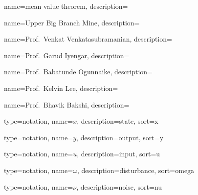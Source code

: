 	{
		name={mean value theorem},
		description={}
	}	
	
	
	{
		name={Upper Big Branch Mine},
		description={}
	}

	{
		name={Prof.~Venkat Venkatasubramanian},
		description={}
	}

	{
		name={Prof.~Garud Iyengar},
		description={}
	}
	
	{
		name={Prof.~Babatunde Ogunnaike},
		description={}
	}

	{
		name={Prof.~Kelvin Lee},
		description={}
	}

	{
		name={Prof.~Bhavik Bakshi},
		description={}
	}







  {
    type=notation,
	name={\ensuremath{x}},
    description={state},
    sort={x}
  }
  
  {
    type=notation,
	name={\ensuremath{y}},
    description={output},
    sort={y}
  }  

  {
    type=notation,
	name={\ensuremath{u}},
    description={input},
    sort={u}
  }

  {
    type=notation,
	name={\ensuremath{\omega}},
    description={disturbance},
    sort={omega}
  }

  {
    type=notation,
	name={\ensuremath{\nu}},
    description={noise},
    sort={nu}
  }  